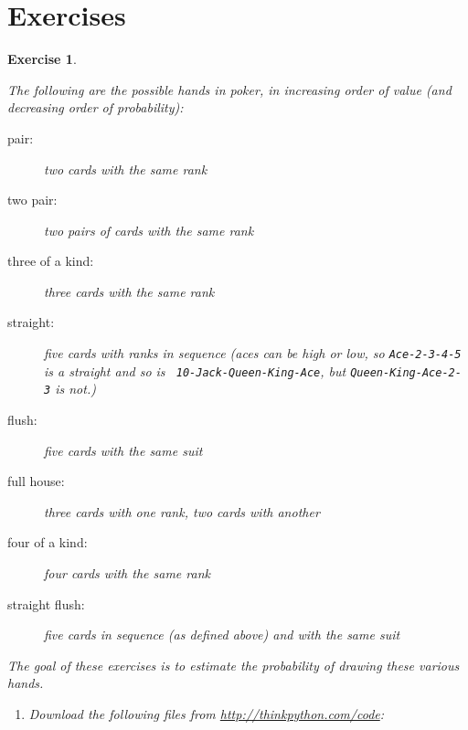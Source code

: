 \documentclass[12pt,a4paper,final,twoside,onecolumn,titlepage]{book}
\newtheorem{exercise}{Exercise}[chapter]
\begin{document}
\section{Exercises}

\begin{exercise}
\label{poker}

The following are the possible hands in poker, in increasing order
of value (and decreasing order of probability):

\begin{description}

\item[pair:] two cards with the same rank
\vspace{-0.05in}

\item[two pair:] two pairs of cards with the same rank
\vspace{-0.05in}

\item[three of a kind:] three cards with the same rank
\vspace{-0.05in}

\item[straight:] five cards with ranks in sequence (aces can
be high or low, so {\tt Ace-2-3-4-5} is a straight and so is {\tt
10-Jack-Queen-King-Ace}, but {\tt Queen-King-Ace-2-3} is not.)
\vspace{-0.05in}

\item[flush:] five cards with the same suit
\vspace{-0.05in}

\item[full house:] three cards with one rank, two cards with another
\vspace{-0.05in}

\item[four of a kind:] four cards with the same rank
\vspace{-0.05in}

\item[straight flush:] five cards in sequence (as defined above) and
with the same suit
\vspace{-0.05in}

\end{description}
%
The goal of these exercises is to estimate
the probability of drawing these various hands.

\begin{enumerate}

\item Download the following files from \url{http://thinkpython.com/code}:


\end{enumerate}
\end{exercise}
\end{document}
